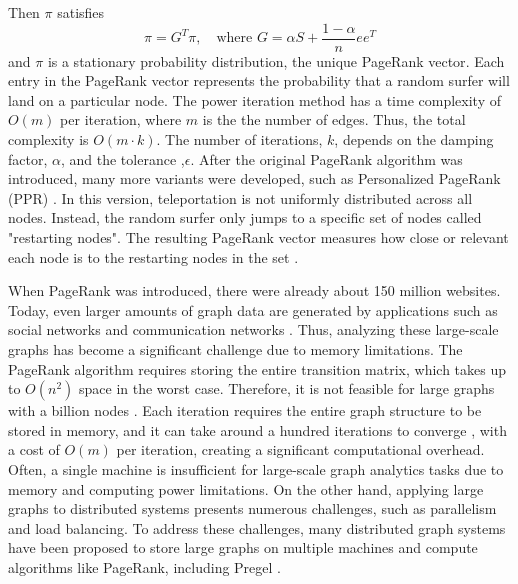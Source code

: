 Then $\pi$ satisfies 
\begin{equation}
    \pi=G^T\pi, \quad \text{where $G=\alpha S +\frac{1-\alpha}{n}ee^T$}
\end{equation}
and $\pi$ is a stationary probability distribution, the unique PageRank vector\cite{langville_googles_2012}\cite{page_pagerank_1999}.
Each entry in the PageRank vector represents the probability that a random surfer will land on a particular node. The power iteration method has a time complexity of $O(m)$ per iteration, where $m$ is the the number of edges. Thus, the total complexity is $O(m\cdot k)$. The number of iterations, $k$, depends on the damping factor, $\alpha$, and the tolerance ,$\epsilon$. After the original PageRank algorithm was introduced, many more variants were developed, such as Personalized PageRank (PPR) \cite{park_survey_2019}.
In this version, teleportation is not uniformly distributed across all nodes. Instead, the random surfer only jumps to a specific set of nodes called  "restarting nodes". The resulting PageRank vector measures how close or relevant each node is to the restarting nodes in the set \cite{priyanta_social_2019}. 

 

When PageRank was introduced, there were already about 150 million websites. Today, even larger amounts of graph data are generated by applications such as social networks and communication networks \cite{gebreegziabher_chapter_2023}. Thus, analyzing these large-scale graphs has become a significant challenge due to memory limitations. The PageRank algorithm requires storing the entire transition matrix, which takes up to $O(n^2)$ space in the worst case. Therefore, it is not feasible for large graphs with a billion nodes \cite{wu_efficient_2024}. Each iteration requires the entire graph structure to be stored in memory, and it can take around a hundred iterations to converge \cite{langville_googles_2012}, with a cost of $O(m)$ per iteration, creating a significant computational overhead. Often, a single machine is insufficient for large-scale graph analytics tasks due to memory and computing power limitations. On the other hand, applying large graphs to distributed systems presents numerous challenges, such as parallelism and load balancing. To address these challenges, many distributed graph systems have been proposed to store large graphs on multiple machines and compute algorithms like PageRank, including Pregel \cite{meng_survey_2024}.


